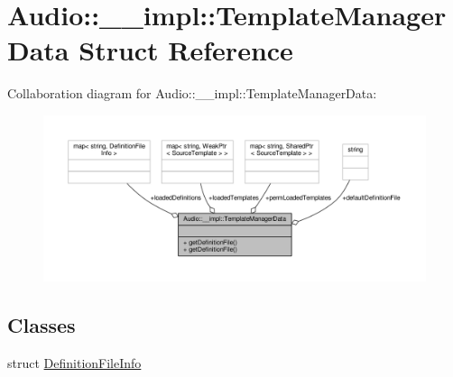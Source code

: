 \hypertarget{structAudio_1_1____impl_1_1TemplateManagerData}{}\section{Audio\+:\+:\+\_\+\+\_\+impl\+:\+:Template\+Manager\+Data Struct Reference}
\label{structAudio_1_1____impl_1_1TemplateManagerData}


Collaboration diagram for Audio\+:\+:\+\_\+\+\_\+impl\+:\+:Template\+Manager\+Data\+:
\nopagebreak
\begin{figure}[H]
\begin{center}
\leavevmode
\includegraphics[width=350pt]{da/dec/structAudio_1_1____impl_1_1TemplateManagerData__coll__graph}
\end{center}
\end{figure}
\subsection*{Classes}
\begin{DoxyCompactItemize}
\item 
struct \hyperlink{structAudio_1_1____impl_1_1TemplateManagerData_1_1DefinitionFileInfo}{Definition\+File\+Info}
\end{DoxyCompactItemize}
